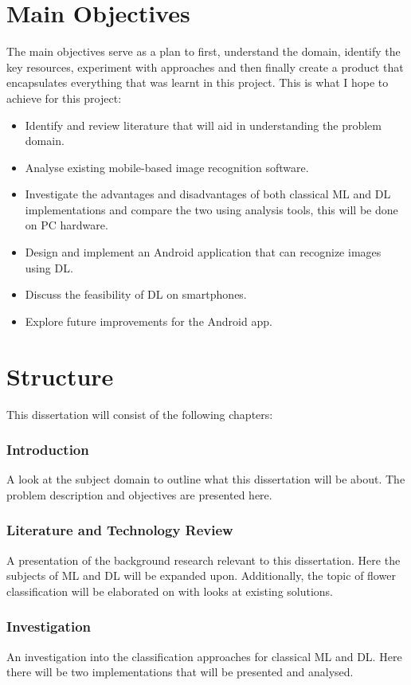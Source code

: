\documentclass[12pt,a4paper]{report}
\begin{document}
\section{Main Objectives}
The main objectives serve as a plan to first, understand the domain, 
identify the key resources, experiment with approaches and then finally create a product that encapsulates 
everything that was learnt in this project. This is what I hope to achieve for this project:
\begin{itemize}
    \item Identify and review literature that will aid in understanding the problem domain.
    \item Analyse existing mobile-based image recognition software.
    \item Investigate the advantages and disadvantages of both classical ML and DL implementations and compare the two 
using analysis tools, this will be done on PC hardware.
    \item Design and implement an Android application that can recognize images using DL.
    \item Discuss the feasibility of DL on smartphones.
    \item Explore future improvements for the Android app.
\end{itemize}

\section{Structure}

This dissertation will consist of the following chapters:
\subsubsection*{Introduction}
A look at the subject domain to outline what this dissertation will be about. The problem description and objectives are
presented here.

\subsubsection*{Literature and Technology Review}
A presentation of the background research relevant to this dissertation. Here the subjects of ML and DL will be
expanded upon. Additionally, the topic of flower classification will be elaborated on with looks at existing solutions.

\subsubsection*{Investigation}
An investigation into the classification approaches for classical ML and DL. Here there will be two implementations that
will be presented and analysed.
\end{document}
